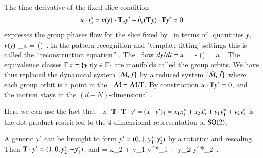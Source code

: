 The time derivative of the fixed slice condition
\[
u \cdot t^*_a =
v(y) \cdot \mathbf{T}_a {y'} -
\dot{{\bf \theta}}_a (\mathbf{T} y) \cdot \mathbf{T} {y'}
= 0
\]
expresses the group phases flow
for the slice fixed by \slicep\ in terms of
\reducedsp\ quantities $y$, $v(y)$
\beq
\dot{\gSpace}_a = 
                       {(\Lg \sspRed) \cdot \Lg \slicep }
\,.
In the pattern recognition and 'template fitting' settings
this is called the ``reconstruction equation''%
.
The \reducedsp\ flow $d\sspRed/dt = \velRed$
\beq
\velRed = \vel - 
                         { (\Lg \sspRed) \cdot \Lg \slicep }
                 \, \Lg_a \sspRed
\,.
The equivalence classes $\Group \, \ssp = \{  \LieEl \, \ssp
| \LieEl \in \Group \}$ are manifolds called the group
orbits. We have thus replaced the dynamical system
$\{\pS,f\}$ by a reduced system $\{\bar{\pS},\bar{f}\}$ where
each  group orbit is a point in the \reducedsp\
$\bar{\pS}=\pS/\Group$. By construction $\velRed \cdot \Lg
\slicep = 0$, and  the motion stays in the
$(d\!-\!N)$-dimensional \slice.

Here we can use the fact that
$- \ssp \cdot \Lg\cdot\Lg \cdot \slicep
 = (\ssp \cdot \slicep )_4 =
    x_1 x_1^{*}
   +x_2 x_2^{*}
   +y_1 y_1^{*}
   +y_2 y_2^{*}
$
is the dot-product restricted to the 4-dimensional
representation of $\SOn{2}$.

A generic  $ \slicep $ can be brought to form $ \slicep  =
(0,1,y_1^{*},y_2^{*})$ by a rotation and rescaling. Then $\Lg
\cdot \slicep   = (1,0,y_2^{*},-y_1^{*})$, and
\beq
{} =
\frac{\vel_1 + \vel_3 y^{*}_2 -\vel_4 y^{*}_1}
     {x_2 + y_1 y^{*}_1 + y_2 y^{*}_2}
\,.
\label{PCsectSin}
\eeq

